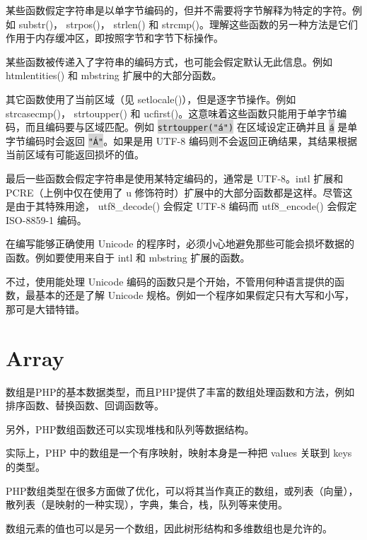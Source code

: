 \begin{compactitem}
\item 某些函数假定字符串是以单字节编码的，但并不需要将字节解释为特定的字符。例如 substr()， strpos()， strlen() 和 strcmp()。理解这些函数的另一种方法是它们作用于内存缓冲区，即按照字节和字节下标操作。
\item 某些函数被传递入了字符串的编码方式，也可能会假定默认无此信息。例如 htmlentities() 和 mbstring 扩展中的大部分函数。
\item 其它函数使用了当前区域（见 setlocale()），但是逐字节操作。例如 strcasecmp()， strtoupper() 和 ucfirst()。这意味着这些函数只能用于单字节编码，而且编码要与区域匹配。例如 \colorbox{lightgray}{\texttt{strtoupper("á")}} 在区域设定正确并且 \colorbox{lightgray}{\texttt{á}} 是单字节编码时会返回 \colorbox{lightgray}{\texttt{"Á"}}。如果是用 UTF-8 编码则不会返回正确结果，其结果根据当前区域有可能返回损坏的值。
\item 最后一些函数会假定字符串是使用某特定编码的，通常是 UTF-8。intl 扩展和 PCRE（上例中仅在使用了 u 修饰符时）扩展中的大部分函数都是这样。尽管这是由于其特殊用途， utf8\_decode() 会假定 UTF-8 编码而 utf8\_encode() 会假定 ISO-8859-1 编码。



\end{compactitem}

在编写能够正确使用 Unicode 的程序时，必须小心地避免那些可能会损坏数据的函数。例如要使用来自于 intl 和 mbstring 扩展的函数。

不过，使用能处理 Unicode 编码的函数只是个开始，不管用何种语言提供的函数，最基本的还是了解 Unicode 规格。例如一个程序如果假定只有大写和小写，那可是大错特错。




\section{Array}

数组是PHP的基本数据类型，而且PHP提供了丰富的数组处理函数和方法，例如排序函数、替换函数、回调函数等。

另外，PHP数组函数还可以实现堆栈和队列等数据结构。

实际上，PHP 中的数组是一个有序映射，映射本身是一种把 values 关联到 keys 的类型。

PHP数组类型在很多方面做了优化，可以将其当作真正的数组，或列表（向量），散列表（是映射的一种实现），字典，集合，栈，队列等来使用。

数组元素的值也可以是另一个数组，因此树形结构和多维数组也是允许的。

